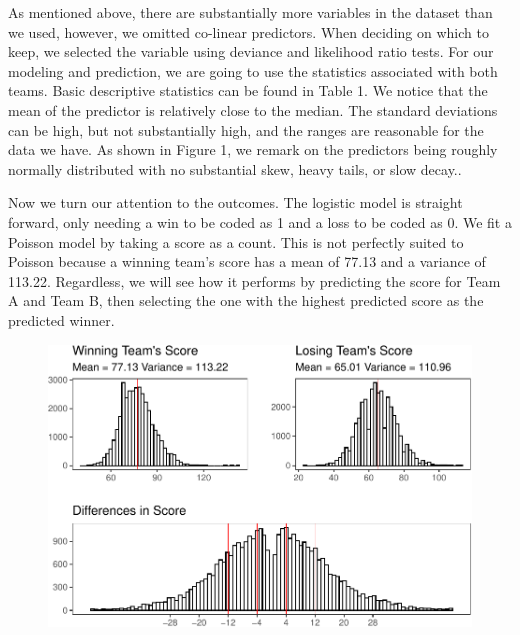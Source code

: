 \documentclass[
  english,
  man,floatsintext]{apa6}
\begin{document}
As mentioned above, there are substantially more variables in the dataset than we used, however, we omitted co-linear predictors. When deciding on which to keep, we selected the variable using deviance and likelihood ratio tests. For our modeling and prediction, we are going to use the statistics associated with both teams. Basic descriptive statistics can be found in Table 1. We notice that the mean of the predictor is relatively close to the median. The standard deviations can be high, but not substantially high, and the ranges are reasonable for the data we have. As shown in Figure 1, we remark on the predictors being roughly normally distributed with no substantial skew, heavy tails, or slow decay..

Now we turn our attention to the outcomes. The logistic model is straight forward, only needing a win to be coded as 1 and a loss to be coded as 0. We fit a Poisson model by taking a score as a count. This is not perfectly suited to Poisson because a winning team's score has a mean of 77.13 and a variance of 113.22. Regardless, we will see how it performs by predicting the score for Team A and Team B, then selecting the one with the highest predicted score as the predicted winner.

\begin{figure}

{\centering \includegraphics{paper_files/figure-latex/unnamed-chunk-3-1} 

}

\caption{ }\label{fig:unnamed-chunk-3}
\end{figure}
\end{document}
